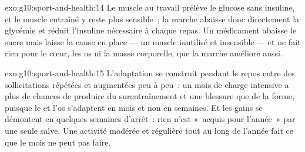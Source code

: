\begin{solution}{exo:g10:sport-and-health:14}
Le muscle au travail prélève le glucose sans insuline, et le muscle
entraîné y reste plus sensible~; la marche abaisse donc directement la
glycémie et réduit l'insuline nécessaire à chaque repas. Un médicament
abaisse le sucre mais laisse la cause en place --- un muscle inutilisé
et insensible --- et ne fait rien pour le cœur, les os ni la masse
corporelle, que la marche améliore aussi.
\end{solution}

\begin{solution}{exo:g10:sport-and-health:15}
L'adaptation se construit pendant le repos entre des sollicitations
répétées et augmentées peu à peu~: un mois de charge intensive a plus
de chances de produire du surentraînement et une blessure que de la
forme, puisque le  et l'os s'adaptent en mois et non en semaines.
Et les gains se démontent en quelques semaines d'arrêt~: rien n'est
«~acquis pour l'année~» par une seule salve. Une activité modérée et
régulière tout au long de l'année fait ce que le mois ne peut pas
faire.
\end{solution}

